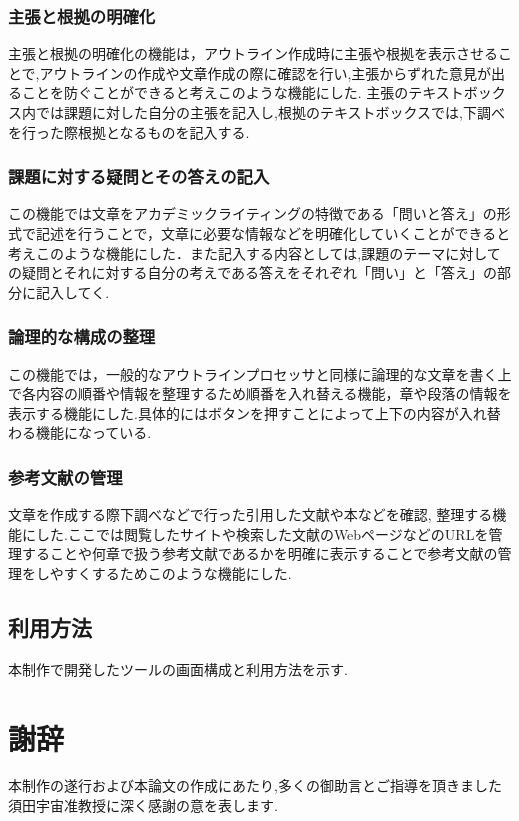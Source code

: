 \documentclass[a4j,12pt]{jarticle}
\begin{document}
\subsubsection{主張と根拠の明確化}
主張と根拠の明確化の機能は，アウトライン作成時に主張や根拠を表示させることで,アウトラインの作成や文章作成の際に確認を行い,主張からずれた意見が出ることを防ぐことができると考えこのような機能にした.
主張のテキストボックス内では課題に対した自分の主張を記入し,根拠のテキストボックスでは,下調べを行った際根拠となるものを記入する.

\subsubsection{課題に対する疑問とその答えの記入}
この機能では文章をアカデミックライティングの特徴である「問いと答え」の形式で記述を行うことで，文章に必要な情報などを明確化していくことができると考えこのような機能にした．また記入する内容としては,課題のテーマに対しての疑問とそれに対する自分の考えである答えをそれぞれ「問い」と「答え」の部分に記入してく.

\subsubsection{論理的な構成の整理}
この機能では，一般的なアウトラインプロセッサと同様に論理的な文章を書く上で各内容の順番や情報を整理するため順番を入れ替える機能，章や段落の情報を表示する機能にした.具体的にはボタンを押すことによって上下の内容が入れ替わる機能になっている.

\subsubsection{参考文献の管理}
文章を作成する際下調べなどで行った引用した文献や本などを確認, 整理する機能にした.ここでは閲覧したサイトや検索した文献のWebページなどのURLを管理することや何章で扱う参考文献であるかを明確に表示することで参考文献の管理をしやすくするためこのような機能にした.

\newpage

\subsection{利用方法}
本制作で開発したツールの画面構成と利用方法を示す.
\newpage

\section*{謝辞}
本制作の遂行および本論文の作成にあたり,多くの御助言とご指導を頂きました須田宇宙准教授に深く感謝の意を表します.

\end{document}
